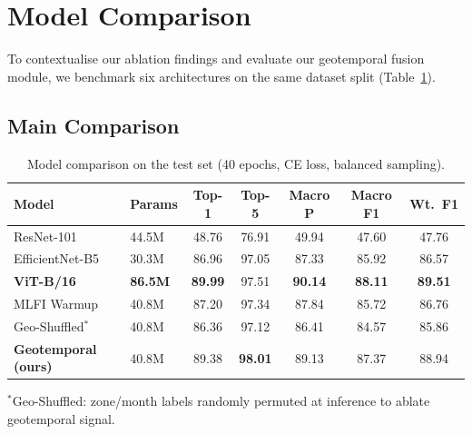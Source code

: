 \documentclass[runningheads]{llncs}
\begin{document}
\section{Model Comparison}
To contextualise our ablation findings and evaluate our geotemporal fusion module, we benchmark six architectures on the same dataset split (Table~\ref{tab:model_comparison}).
\subsection{Main Comparison}
\begin{table}[H]
\centering
\caption{Model comparison on the test set (40 epochs, CE loss, balanced sampling).}
\label{tab:model_comparison}
\small
\begin{tabular}{@{}llccccc@{}}
\toprule
\textbf{Model} & \textbf{Params} & \textbf{Top-1} & \textbf{Top-5} & \textbf{Macro P} & \textbf{Macro F1} & \textbf{Wt.\ F1} \\
\midrule
ResNet-101 & 44.5M & 48.76 & 76.91 & 49.94 & 47.60 & 47.76 \\
EfficientNet-B5 & 30.3M & 86.96 & 97.05 & 87.33 & 85.92 & 86.57 \\
\textbf{ViT-B/16} & \textbf{86.5M} & \textbf{89.99} & 97.51 & \textbf{90.14} & \textbf{88.11} & \textbf{89.51} \\
MLFI Warmup & 40.8M & 87.20 & 97.34 & 87.84 & 85.72 & 86.76 \\
Geo-Shuffled$^*$ & 40.8M & 86.36 & 97.12 & 86.41 & 84.57 & 85.86 \\
\textbf{Geotemporal (ours)} & 40.8M & 89.38 & \textbf{98.01} & 89.13 & 87.37 & 88.94 \\
\bottomrule
\end{tabular}
\raggedright\scriptsize{$^*$Geo-Shuffled: zone/month labels randomly permuted at inference to ablate geotemporal signal.}
\end{table}
\end{document}
